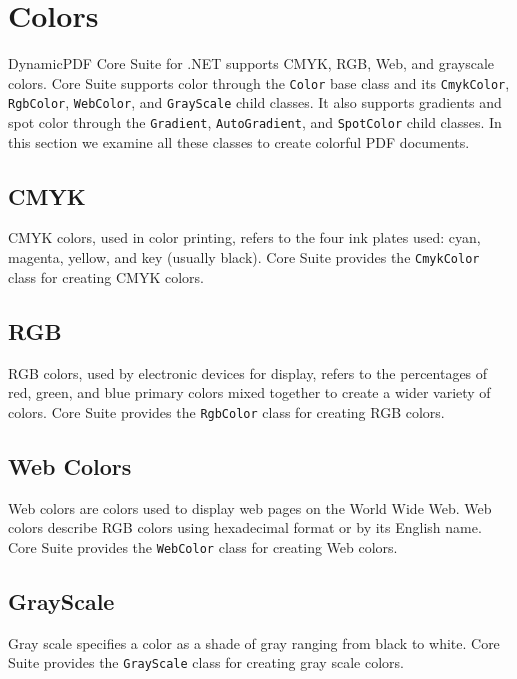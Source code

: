 \documentclass[american,letterpaper]{tufte-book}
\numberwithin{equation}{section}
\numberwithin{figure}{section}
\begin{document}
{\section{Colors}\label{sec:Colors}

DynamicPDF Core Suite for .NET supports CMYK, RGB, Web, and grayscale
colors. Core Suite supports color through the \texttt{Color} base
class and its \texttt{CmykColor}, \texttt{RgbColor}, \texttt{WebColor},
and \texttt{GrayScale} child classes. It also supports gradients and
spot color through the \texttt{Gradient}, \texttt{AutoGradient}, and
\texttt{SpotColor} child classes. In this section we examine all these
classes to create colorful PDF documents.

\subsection{CMYK}

CMYK colors, used in color printing, refers to the four ink plates
used: cyan, magenta, yellow, and key (usually black). Core Suite provides
the \texttt{CmykColor} class for creating CMYK colors.

\subsection{RGB}

RGB colors, used by electronic devices for display, refers to the
percentages of red, green, and blue primary colors mixed together
to create a wider variety of colors. Core Suite provides the \texttt{RgbColor}
class for creating RGB colors.

\subsection{Web Colors}

Web colors are colors used to display web pages on the World Wide
Web. Web colors describe RGB colors using hexadecimal format or by
its English name. Core Suite provides the \texttt{WebColor} class
for creating Web colors.

\subsection{GrayScale}

Gray scale specifies a color as a shade of gray ranging from black
to white. Core Suite provides the \texttt{GrayScale} class for creating
gray scale colors.

}
\end{document}
